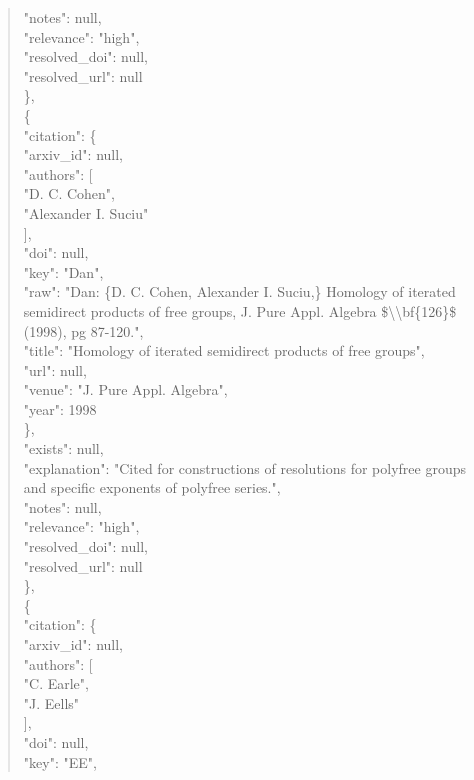 \documentclass[11pt]{article}
\begin{document}
\begin{quote}
      "notes": null,\\
      "relevance": "high",\\
      "resolved\_doi": null,\\
      "resolved\_url": null\\
    \},\\
    \{\\
      "citation": \{\\
        "arxiv\_id": null,\\
        "authors": [\\
          "D. C. Cohen",\\
          "Alexander I. Suciu"\\
        ],\\
        "doi": null,\\
        "key": "Dan",\\
        "raw": "Dan: \{D. C. Cohen, Alexander I. Suciu,\} Homology of iterated semidirect products of free groups, J. Pure Appl. Algebra \$\textbackslash{}\textbackslash{}bf\{126\}\$ (1998), pg 87-120.",\\
        "title": "Homology of iterated semidirect products of free groups",\\
        "url": null,\\
        "venue": "J. Pure Appl. Algebra",\\
        "year": 1998\\
      \},\\
      "exists": null,\\
      "explanation": "Cited for constructions of resolutions for polyfree groups and specific exponents of polyfree series.",\\
      "notes": null,\\
      "relevance": "high",\\
      "resolved\_doi": null,\\
      "resolved\_url": null\\
    \},\\
    \{\\
      "citation": \{\\
        "arxiv\_id": null,\\
        "authors": [\\
          "C. Earle",\\
          "J. Eells"\\
        ],\\
        "doi": null,\\
        "key": "EE",\\

\end{quote}
\end{document}
